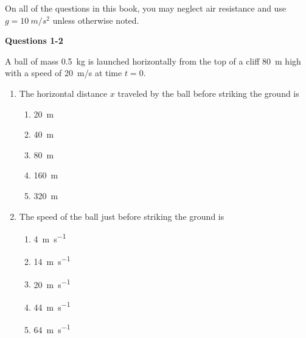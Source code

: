 \documentclass{../../oss-apphys}
\begin{document}
\genheader


\genmultidirections

\gengravity

\raggedcolumns
\begin{multicols}{2}

  On all of the questions in this book, you may neglect air resistance and use
  $g=\SI{10}{m/s^2}$ unless otherwise noted.

  \vspace{.3in}\textbf{Questions 1-2}
  
  A ball of mass \SI{.5}{\kilo\gram} is launched horizontally from the top of a
  cliff \SI{80}{m} high with a speed of \SI{20}{m/s} at time $t=0$.
  \begin{center}
  \end{center}
  \begin{enumerate}[leftmargin=18pt]
  \item The horizontal distance $x$ traveled by the ball before striking the
    ground is
    \begin{enumerate}[noitemsep,topsep=0pt,leftmargin=18pt,label=(\Alph*)]
    \item\SI{20 }{m}
    \item\SI{40 }{m}
    \item\SI{80 }{m} 
    \item\SI{160}{m}
    \item\SI{320}{m}
    \end{enumerate}

  \item The speed of the ball just before striking the ground is
    \begin{enumerate}[noitemsep,topsep=0pt,leftmargin=18pt,label=(\Alph*)]
    \item\SI{4 }{\metre\per\second}
    \item\SI{14}{\metre\per\second}
    \item\SI{20}{\metre\per\second}
    \item\SI{44}{\metre\per\second}
    \item\SI{64}{\metre\per\second}
    \end{enumerate}
  \end{enumerate}


\end{multicols}
\end{document}
